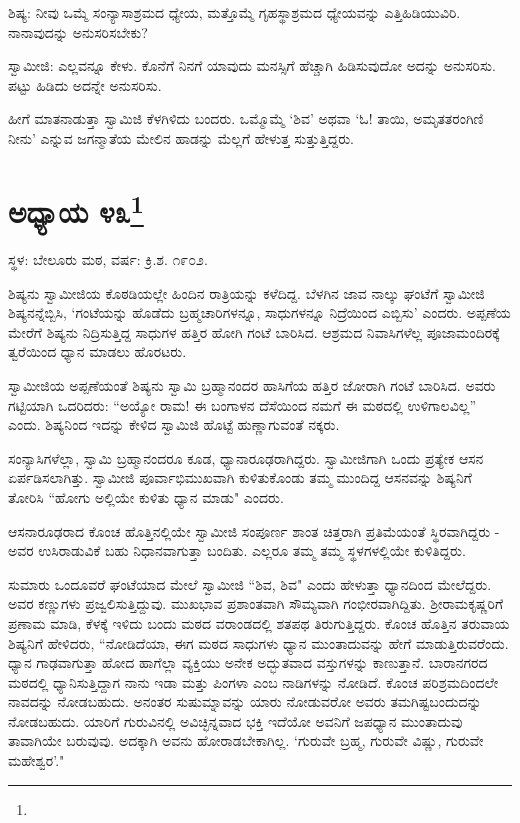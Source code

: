 ಶಿಷ್ಯ: ನೀವು ಒಮ್ಮೆ ಸಂನ್ಯಾಸಾಶ್ರಮದ ಧ್ಯೇಯ, ಮತ್ತೊಮ್ಮೆ ಗೃಹಸ್ಥಾಶ್ರಮದ ಧ್ಯೇಯವನ್ನು ಎತ್ತಿಹಿಡಿಯುವಿರಿ. ನಾನಾವುದನ್ನು ಅನುಸರಿಸಬೇಕು?

ಸ್ವಾಮೀಜಿ: ಎಲ್ಲವನ್ನೂ ಕೇಳು. ಕೊನೆಗೆ ನಿನಗೆ ಯಾವುದು ಮನಸ್ಸಿಗೆ ಹೆಚ್ಚಾಗಿ ಹಿಡಿಸುವುದೋ ಅದನ್ನು ಅನುಸರಿಸು. ಪಟ್ಟು ಹಿಡಿದು ಅದನ್ನೇ ಅನುಸರಿಸು.

ಹೀಗೆ ಮಾತನಾಡುತ್ತಾ ಸ್ವಾಮಿಜಿ ಕೆಳಗಿಳಿದು ಬಂದರು. ಒಮ್ಮೊಮ್ಮೆ ‘ಶಿವ’ ಅಥವಾ ‘ಓ! ತಾಯಿ, ಅಮೃತತರಂಗಿಣಿ ನೀನು’ ಎನ್ನುವ ಜಗನ್ಮಾತೆಯ ಮೇಲಿನ ಹಾಡನ್ನು ಮೆಲ್ಲಗೆ ಹೇಳುತ್ತ ಸುತ್ತುತ್ತಿದ್ದರು.

\newpage

\chapter[ಅಧ್ಯಾಯ ೪೩]{ಅಧ್ಯಾಯ ೪೩\protect\footnote{}}

\centerline{ಸ್ಥಳ: ಬೇಲೂರು ಮಠ, ವರ್ಷ: ಕ್ರಿ.ಶ. ೧೯೦೨.}

ಶಿಷ್ಯನು ಸ್ವಾಮೀಜಿಯ ಕೊಠಡಿಯಲ್ಲೇ ಹಿಂದಿನ ರಾತ್ರಿಯನ್ನು ಕಳೆದಿದ್ದ. ಬೆಳಗಿನ ಜಾವ ನಾಲ್ಕು ಘಂಟೆಗೆ ಸ್ವಾಮೀಜಿ ಶಿಷ್ಯನನ್ನೆಬ್ಬಿಸಿ, ‘ಗಂಟೆಯನ್ನು ಹೊಡೆದು ಬ್ರಹ್ಮಚಾರಿಗಳನ್ನೂ, ಸಾಧುಗಳನ್ನೂ ನಿದ್ರೆಯಿಂದ ಎಬ್ಬಿಸು’ ಎಂದರು. ಅಪ್ಪಣೆಯ ಮೇರೆಗೆ ಶಿಷ್ಯನು ನಿದ್ರಿಸುತ್ತಿದ್ದ ಸಾಧುಗಳ ಹತ್ತಿರ ಹೋಗಿ ಗಂಟೆ ಬಾರಿಸಿದ. ಆಶ್ರಮದ ನಿವಾಸಿಗಳೆಲ್ಲ ಪೂಜಾಮಂದಿರಕ್ಕೆ ತ್ವರೆಯಿಂದ ಧ್ಯಾನ ಮಾಡಲು ಹೊರಟರು.

ಸ್ವಾಮೀಜಿಯ ಅಪ್ಪಣೆಯಂತೆ ಶಿಷ್ಯನು ಸ್ವಾಮಿ ಬ್ರಹ್ಮಾನಂದರ ಹಾಸಿಗೆಯ ಹತ್ತಿರ ಜೋರಾಗಿ ಗಂಟೆ ಬಾರಿಸಿದ. ಅವರು ಗಟ್ಟಿಯಾಗಿ ಒದರಿದರು: “ಅಯ್ಯೋ ರಾಮ! ಈ ಬಂಗಾಳನ ದೆಸೆಯಿಂದ ನಮಗೆ ಈ ಮಠದಲ್ಲಿ ಉಳಿಗಾಲವಿಲ್ಲ” ಎಂದು. ಶಿಷ್ಯನಿಂದ ಇದನ್ನು ಕೇಳಿದ ಸ್ವಾಮಿಜಿ ಹೊಟ್ಟೆ ಹುಣ್ಣಾಗುವಂತೆ ನಕ್ಕರು.

ಸಂನ್ಯಾಸಿಗಳೆಲ್ಲಾ, ಸ್ವಾಮಿ ಬ್ರಹ್ಮಾನಂದರೂ ಕೂಡ, ಧ್ಯಾನಾರೂಢರಾಗಿದ್ದರು. ಸ್ವಾಮೀಜಿಗಾಗಿ ಒಂದು ಪ್ರತ್ಯೇಕ ಆಸನ ಏರ್ಪಡಿಸಲಾಗಿತ್ತು. ಸ್ವಾಮೀಜಿ ಪೂರ್ವಾಭಿಮುಖವಾಗಿ ಕುಳಿತುಕೊಂಡು ತಮ್ಮ ಮುಂದಿದ್ದ ಆಸನವನ್ನು ಶಿಷ್ಯನಿಗೆ ತೋರಿಸಿ “ಹೋಗು ಅಲ್ಲಿಯೇ ಕುಳಿತು ಧ್ಯಾನ ಮಾಡು" ಎಂದರು.

ಆಸನಾರೂಢರಾದ ಕೊಂಚ ಹೊತ್ತಿನಲ್ಲಿಯೇ ಸ್ವಾಮೀಜಿ ಸಂಪೂರ್ಣ ಶಾಂತ ಚಿತ್ತರಾಗಿ ಪ್ರತಿಮೆಯಂತೆ ಸ್ಥಿರವಾಗಿದ್ದರು - ಅವರ ಉಸಿರಾಡುವಿಕೆ ಬಹು ನಿಧಾನವಾಗುತ್ತಾ ಬಂದಿತು. ಎಲ್ಲರೂ ತಮ್ಮ ತಮ್ಮ ಸ್ಥಳಗಳಲ್ಲಿಯೇ ಕುಳಿತಿದ್ದರು.

ಸುಮಾರು ಒಂದೂವರೆ ಘಂಟೆಯಾದ ಮೇಲೆ ಸ್ವಾಮೀಜಿ “ಶಿವ, ಶಿವ" ಎಂದು ಹೇಳುತ್ತಾ ಧ್ಯಾನದಿಂದ ಮೇಲೆದ್ದರು. ಅವರ ಕಣ್ಣುಗಳು ಪ್ರಜ್ವಲಿಸುತ್ತಿದ್ದುವು. ಮುಖಭಾವ ಪ್ರಶಾಂತವಾಗಿ ಸೌಮ್ಯವಾಗಿ ಗಂಭೀರವಾಗಿದ್ದಿತು. ಶ‍್ರೀರಾಮಕೃಷ್ಣರಿಗೆ ಪ್ರಣಾಮ ಮಾಡಿ, ಕೆಳಕ್ಕೆ ಇಳಿದು ಬಂದು ಮಠದ ವರಾಂಡದಲ್ಲಿ ಶತಪಥ ತಿರುಗುತ್ತಿದ್ದರು. ಕೊಂಚ ಹೊತ್ತಿನ ತರುವಾಯ ಶಿಷ್ಯನಿಗೆ ಹೇಳಿದರು, “ನೋಡಿದೆಯಾ, ಈಗ ಮಠದ ಸಾಧುಗಳು ಧ್ಯಾನ ಮುಂತಾದುವನ್ನು ಹೇಗೆ ಮಾಡುತ್ತಿರುವರೆಂದು. ಧ್ಯಾನ ಗಾಢವಾಗುತ್ತಾ ಹೋದ ಹಾಗೆಲ್ಲಾ ವ್ಯಕ್ತಿಯು ಅನೇಕ ಅದ್ಭುತವಾದ ವಸ್ತುಗಳನ್ನು ಕಾಣುತ್ತಾನೆ. ಬಾರಾನಗರದ ಮಠದಲ್ಲಿ ಧ್ಯಾನಿಸುತ್ತಿದ್ದಾಗ ನಾನು ಇಡಾ ಮತ್ತು ಪಿಂಗಳಾ ಎಂಬ ನಾಡಿಗಳನ್ನು ನೋಡಿದೆ. ಕೊಂಚ ಪರಿಶ್ರಮದಿಂದಲೇ ನಾವದನ್ನು ನೋಡಬಹುದು. ಅನಂತರ ಸುಷುಮ್ನಾವನ್ನು ಯಾರು ನೋಡುವರೋ ಅವರು ತಮಗಿಷ್ಟಬಂದುದನ್ನು ನೋಡಬಹುದು. ಯಾರಿಗೆ ಗುರುವಿನಲ್ಲಿ ಅವಿಚ್ಛಿನ್ನವಾದ ಭಕ್ತಿ ಇದೆಯೋ ಅವನಿಗೆ ಜಪಧ್ಯಾನ ಮುಂತಾದುವು ತಾವಾಗಿಯೇ ಬರುವುವು. ಅದಕ್ಕಾಗಿ ಅವನು ಹೋರಾಡಬೇಕಾಗಿಲ್ಲ. ‘ಗುರುವೇ ಬ್ರಹ್ಮ, ಗುರುವೇ ವಿಷ್ಣು, ಗುರುವೇ ಮಹೇಶ್ವರ’."

